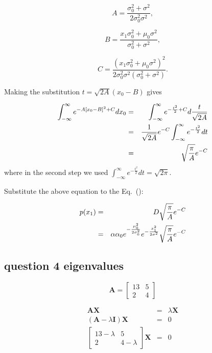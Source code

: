 \documentclass[english,11pt]{article}
\begin{document}
\begin{equation}
A=\frac{\sigma_{0}^{2}+\sigma^{2}}{2\sigma_{0}^{2}\sigma^{2}},    
\end{equation}


\begin{equation}
B=\frac{x_{1}\sigma_{0}^{2}+\mu_{0}\sigma^{2}}{\sigma_{0}^{2}+\sigma^{2}},
\end{equation}


\begin{equation}
C=\frac{(x_{1}\sigma_{0}^{2}+\mu_{0}\sigma^{2})^{2}}{2\sigma_{0}^{2}\sigma^{2}(\sigma_{0}^{2}+\sigma^{2})}.    
\end{equation}


Making the substitution $t=\sqrt{2A}(x_{0}-B)$ gives

\begin{eqnarray}
\int_{-\infty}^{\infty}e^{-A[x_{0}-B]^{2}+C}dx_{0} & = & \int_{-\infty}^{\infty}e^{-\frac{t^{2}}{2}+C}d\frac{t}{\sqrt{2A}} \notag \\
 & = & \frac{1}{\sqrt{2A}}e^{-C}\int_{-\infty}^{\infty}e^{-\frac{t^{2}}{2}}dt \notag \\
 & = & \sqrt{\frac{\pi}{A}}e^{-C}
\end{eqnarray}
where in the second step we used $\int_{-\infty}^{\infty}e^{-\frac{t^{2}}{2}}dt=\sqrt{2\pi}$. 

Substitute the above equation to the Eq.~():

\begin{eqnarray}
p(x_{1}) & = & D\sqrt{\frac{\pi}{A}}e^{-C} \notag \\
 & = & \alpha\alpha_{0}e^{-\frac{\mu_{0}^{2}}{2\sigma_{0}^{2}}}e^{-\frac{x_{1}^{2}}{2\sigma^{2}}}\sqrt{\frac{\pi}{A}}e^{-C}
\end{eqnarray}

\subsection{question 4 eigenvalues}

\[
\boldsymbol{A}=\left[\begin{array}{cc}
13 & 5\\
2 & 4
\end{array}\right]
\]

\begin{eqnarray*}
\boldsymbol{A}\boldsymbol{X} & = & \lambda\boldsymbol{X}\\
(\boldsymbol{A}-\lambda\boldsymbol{I})\boldsymbol{X} & = & 0\\
\left[\begin{array}{cc}
13-\lambda & 5\\
2 & 4-\lambda
\end{array}\right]\boldsymbol{X} & = & 0
\end{eqnarray*}
\end{document}
